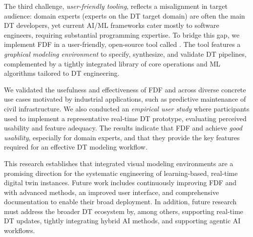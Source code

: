 {The third challenge, \emph{user-friendly tooling}, reflects a misalignment in target audience: domain experts (experts on the DT target domain) are often the main DT developers, yet current AI/ML frameworks cater mostly to software engineers, requiring substantial programming expertise. To bridge this gap, we implement FDF in a user-friendly, open-source tool called \Builder. The tool features a \emph{graphical modeling environment} to specify, synthesize, and validate DT pipelines, complemented by a tightly integrated library of core operations and ML algorithms tailored to DT engineering.

We validated the usefulness and effectiveness of FDF and \Builder across diverse concrete use cases motivated by industrial applications, such as predictive maintenance of civil infrastructure. We also conducted an \emph{empirical user study} where participants used {\Builder} to implement a representative real-time DT prototype, evaluating perceived usability and feature adequacy. The results indicate that FDF and \Builder achieve \emph{good usability}, especially for domain experts, and that they provide the key features required for an effective DT modeling workflow.


This research establishes that integrated visual modeling environments are a promising direction for the systematic engineering of learning-based, real-time digital twin instances. Future work includes continuously improving FDF and {\Builder} with advanced methods, an improved user interface, and comprehensive documentation to enable their broad deployment. In addition,
future research must address the broader DT ecosystem by, among others, supporting real-time DT updates, tightly integrating hybrid AI methods, and supporting agentic AI workflows.

}

